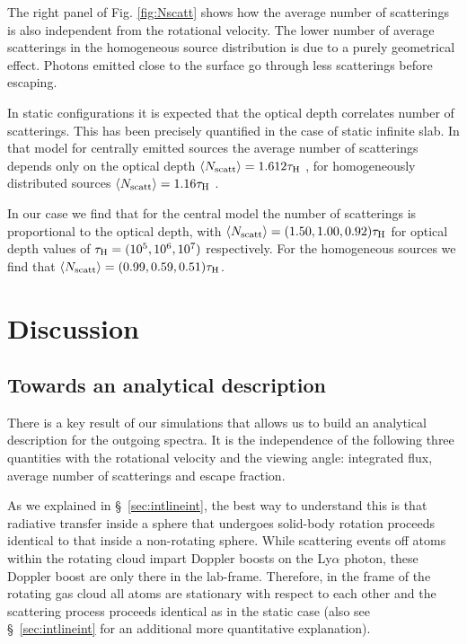 \documentclass{emulateapj}
\begin{document}
The right panel of Fig. \ref{fig:Nscatt} shows how the average
number of scatterings is also independent from the rotational
velocity. 
The lower number of average scatterings in the homogeneous source
distribution is due to a purely geometrical effect.
Photons emitted close to the surface go through less scatterings
before escaping.


In static configurations it is expected that the optical depth correlates number of
scatterings.  
This has been precisely quantified in the case of static infinite
slab. 
In that model for centrally emitted sources the average number of
scatterings depends only on the optical depth $\langle N_{\rm
  scatt}\rangle=1.612\tau_{\rm   H}$ \citep{Adams72,Harrington73}, for
homogeneously distributed sources $\langle N_{\rm
  scatt}\rangle=1.16\tau_{\rm   H}$ \citep{Harrington73}.

In our case we find that for the central model the number of
scatterings is proportional to the optical depth, with $\langle N_{\rm
  scatt}\rangle= (1.50, 1.00, 0.92)\tau_{\rm   H}$ for optical depth
values of $\tau_{\rm H} = (10^{5}, 10^{6}, 10^{7})$ respectively.
For the homogeneous sources we find that $\langle N_{\rm
  scatt}\rangle= (0.99, 0.59, 0.51)\tau_{\rm   H}$.





\section{Discussion}
\label{sec:discussion}

\subsection{Towards an analytical description}

There is a key result of our simulations that allows us to build an
analytical description for the outgoing spectra.
It is the independence of the following three quantities with the rotational
velocity and the viewing angle: integrated flux, average number of
scatterings and escape fraction.

As we explained in \S~\ref{sec:intlineint}, the best way to understand this is that radiative transfer inside a sphere that undergoes solid-body rotation
proceeds identical to that inside a non-rotating sphere. While scattering events off atoms within the rotating cloud impart
Doppler boosts on the Ly$\alpha$ photon, these Doppler boost are only
there in the lab-frame. Therefore, in the frame of the rotating gas cloud all atoms are
stationary with respect to each other and the scattering process
proceeds identical as in the static case (also see \S~\ref{sec:intlineint} for an additional more quantitative explanation).  
\end{document}
